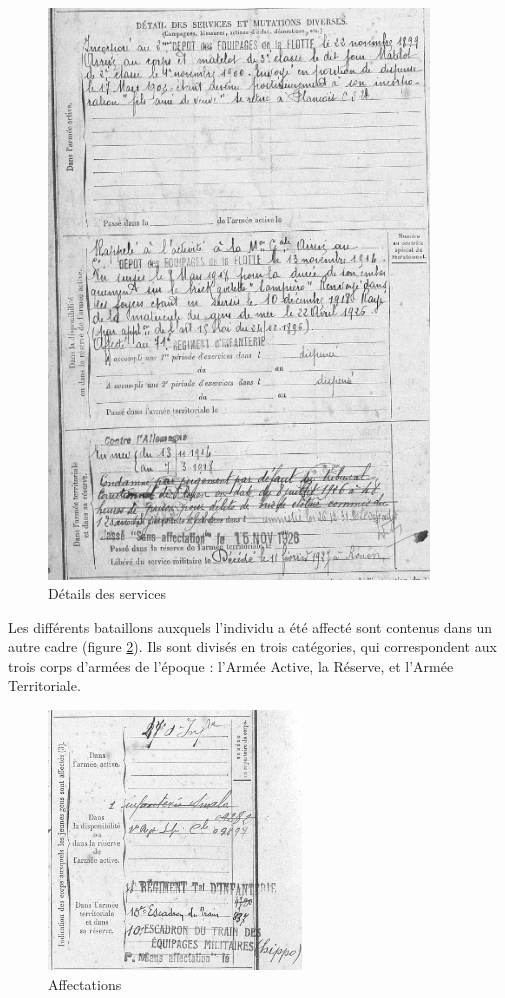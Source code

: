 \documentclass[a4paper]{article}
\begin{document}
\begin{figure}[H]
\centering
\includegraphics[width=0.9\textwidth]{DetailsService_2.PNG}
\caption{\label{fig:detailsservice}D\'etails des services}
\end{figure}
     
    Les diff\'erents bataillons auxquels l'individu a \'et\'e affect\'e sont contenus dans un autre cadre (figure \ref{fig:affectations}). Ils sont divis\'es en trois cat\'egories, qui correspondent aux trois corps d'arm\'ees de l'\'epoque : l'Arm\'ee Active, la R\'eserve, et l'Arm\'ee Territoriale.
   
\begin{figure}[H]
\centering
\includegraphics[width=0.6\textwidth]{Affectations_2.PNG}
\caption{\label{fig:affectations}Affectations}
\end{figure}
	
\end{document}
